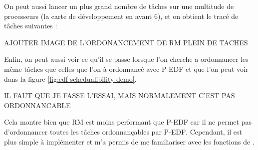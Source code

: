 On peut aussi lancer un plus grand nombre de tâches sur une multitude de processeurs (la carte de développement en ayant 6), et on obtient le tracé de tâches suivantes : 
\begin{center}
    \color{red} AJOUTER IMAGE DE L'ORDONANCEMENT DE RM PLEIN DE TACHES
\end{center}


Enfin, on peut aussi voir ce qu'il se passe lorsque l'on cherche a ordonnancer les même tâches que celles que l'on à ordonnancé avec P-EDF et que l'on peut voir dans la figure \ref{fig:edf-schedualibility-demo}.

\begin{center}
    \color{red}IL FAUT QUE JE FASSE L'ESSAI, MAIS NORMALEMENT C'EST PAS ORDONNANCABLE
\end{center}

Cela montre bien que RM est moins performant que P-EDF car il ne permet pas d'ordonnancer toutes les tâches ordonnançables par P-EDF. Cependant, il est plus simple à implémenter et m'a permis de me familiariser avec les fonctions de \litmus.


